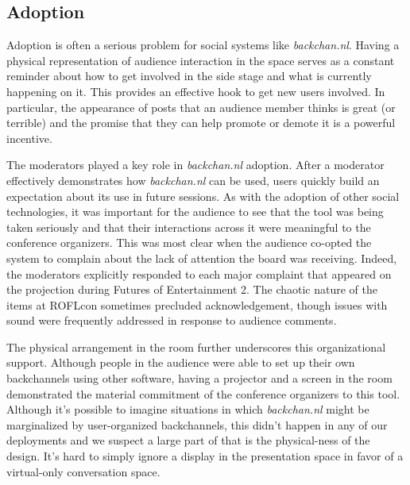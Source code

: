 \subsection{Adoption}

Adoption is often a serious problem for social systems like \emph{backchan.nl}. \citep{Orlikowski:1992tza} Having a physical representation of audience interaction in the space serves as a constant reminder about how to get involved in the side stage and what is currently happening on it. This provides an effective hook to get new users involved. In particular, the appearance of posts that an audience member thinks is great (or terrible) and the promise that they can help promote or demote it is a powerful incentive. 

The moderators played a key role in \emph{backchan.nl} adoption. After a moderator effectively demonstrates how \emph{backchan.nl} can be used, users quickly build an expectation about its use in future sessions. As with the adoption of other social technologies, it was important for the audience to see that the tool was being taken seriously and that their interactions across it were meaningful to the conference organizers.\citep{Orlikowski:1992tza} This was most clear when the audience co-opted the system to complain about the lack of attention the board was receiving. Indeed, the moderators explicitly responded to each major complaint that appeared on the projection during Futures of Entertainment 2. The chaotic nature of the items at ROFLcon sometimes precluded acknowledgement, though issues with sound were frequently addressed in response to audience comments. 

The physical arrangement in the room further underscores this organizational support. Although people in the audience were able to set up their own backchannels using other software, having a projector and a screen in the room demonstrated the material commitment of the conference organizers to this tool. Although it's possible to imagine situations in which \emph{backchan.nl} might be marginalized by user-organized backchannels, this didn't happen in any of our deployments and we suspect a large part of that is the physical-ness of the design. It's hard to simply ignore a display in the presentation space in favor of a virtual-only conversation space.



